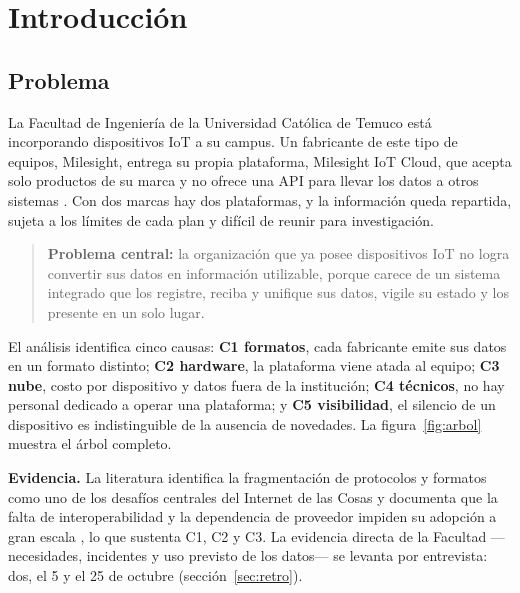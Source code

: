\chapter[Introducción]{Introducción}
\label{cap:intro}

\section{Problema}
\label{sec:problema}

La Facultad de Ingeniería de la Universidad Católica de Temuco está incorporando dispositivos IoT a su
campus. Un fabricante de este tipo de equipos, Milesight, entrega su propia plataforma, Milesight IoT
Cloud, que acepta solo productos de su marca y no ofrece una API para llevar los datos a otros sistemas
\parencite{milesightfaq}. Con dos marcas hay dos plataformas, y la información queda repartida, sujeta
a los límites de cada plan y difícil de reunir para investigación.

\begin{quote}
\textbf{Problema central:} la organización que ya posee dispositivos IoT no logra convertir sus datos
en información utilizable, porque carece de un sistema integrado que los registre, reciba y unifique
sus datos, vigile su estado y los presente en un solo lugar.
\end{quote}

El análisis identifica cinco causas: \textbf{C1 formatos}, cada fabricante emite sus datos en un
formato distinto; \textbf{C2 hardware}, la plataforma viene atada al equipo; \textbf{C3 nube}, costo
por dispositivo y datos fuera de la institución; \textbf{C4 técnicos}, no hay personal dedicado a
operar una plataforma; y \textbf{C5 visibilidad}, el silencio de un dispositivo es indistinguible de
la ausencia de novedades. La figura~\ref{fig:arbol} muestra el árbol completo.



\textbf{Evidencia.} La literatura identifica la fragmentación de protocolos y formatos como uno de los
desafíos centrales del Internet de las Cosas \parencite{alfuqaha2015} y documenta que la falta de
interoperabilidad y la dependencia de proveedor impiden su adopción a gran escala \parencite{noura2019},
lo que sustenta C1, C2 y C3. La evidencia directa de la Facultad ---necesidades, incidentes y uso
previsto de los datos--- se levanta por entrevista: dos, el 5 y el 25 de octubre (sección~\ref{sec:retro}).

